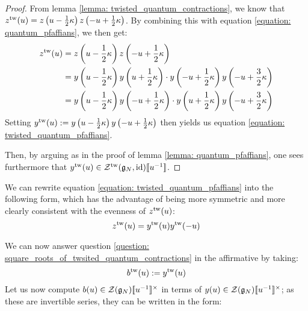                \begin{proof}
                    From lemma \ref{lemma: twisted_quantum_contractions}, we know that $z^{\mathrm{tw}}(u) = z\left( u - \frac12 \kappa \right) z\left( -u + \frac12 \kappa \right)$. By combining this with equation \eqref{equation: quantum_pfaffians}, we then get:
                        $$
                            \begin{aligned}
                                z^{\mathrm{tw}}(u) & = z\left( u - \frac12 \kappa \right) z\left( -u + \frac12 \kappa \right)
                                \\
                                & = y\left( u - \frac12 \kappa \right) y\left( u + \frac12 \kappa \right) \cdot y\left( -u + \frac12 \kappa \right) y\left( -u + \frac32 \kappa \right)
                                \\
                                & = y\left( u - \frac12 \kappa \right) y\left( -u + \frac12 \kappa \right) \cdot y\left( u + \frac12 \kappa \right) y\left( -u + \frac32 \kappa \right)
                            \end{aligned}
                        $$
                    Setting $y^{\mathrm{tw}}(u) := y\left( u - \frac12 \kappa \right) y\left( -u + \frac12 \kappa \right)$ then yields us equation \eqref{equation: twisted_quantum_pfaffians}.

                    Then, by arguing as in the proof of lemma \ref{lemma: quantum_pfaffians}, one sees furthermore that $y^{\mathrm{tw}}(u) \in \mathcal{Z}^{\mathrm{tw}}(\mathfrak{g}_N, \mathrm{id})[\![u^{-1}]\!]$.
                \end{proof}
            \begin{remark}
                We can rewrite equation \eqref{equation: twisted_quantum_pfaffians} into the following form, which has the advantage of being more symmetric and more clearly consistent with the evenness of $z^{\mathrm{tw}}(u)$:
                    \begin{equation} \label{equation: symmetrised_twisted_quantum_pfaffians}
                        z^{\mathrm{tw}}(u) = y^{\mathrm{tw}}(u) y^{\mathrm{tw}}(-u)
                    \end{equation}
            \end{remark}
            We can now answer question \ref{question: square_roots_of_twsited_quantum_contractions} in the affirmative by taking:
                $$b^{\mathrm{tw}}(u) := y^{\mathrm{tw}}(u)$$
            Let us now compute $b(u) \in \calZ(\g_N)[\![u^{-1}]\!]^{\x}$ in terms of $y(u) \in \calZ(\g_N)[\![u^{-1}]\!]^{\x}$; as these are invertible series, they can be written in the form:
